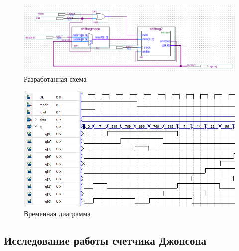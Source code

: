 \documentclass[a4paper,12pt]{article}
\begin{document}
    \begin{figure}[H]
        \centering
        \includegraphics[width=\linewidth]{scheme2}
        \caption{Разработанная схема}
    \end{figure}
    \begin{figure}[H]
        \centering
        \includegraphics[width=\linewidth]{wave2}
        \caption{Временная диаграмма}
    \end{figure}
    
    \subsection{Исследование работы счетчика Джонсона}
    
\end{document}
